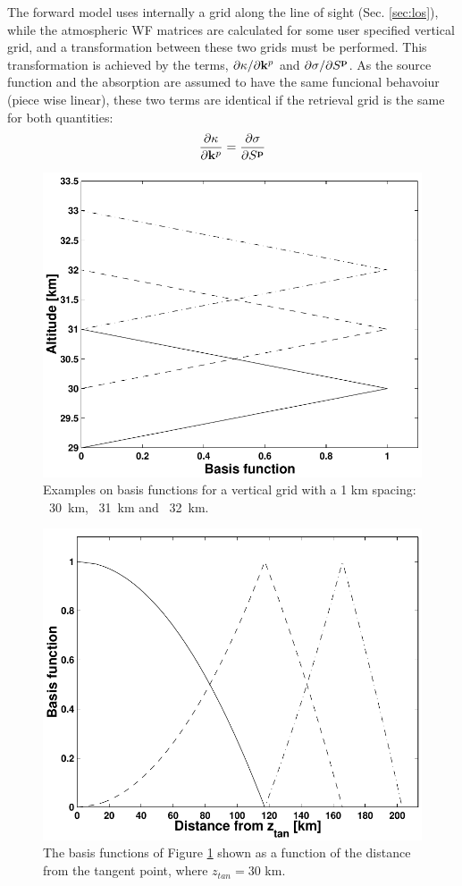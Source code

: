  
 The forward model uses
 internally a grid along the line of sight (Sec. \ref{sec:los}), while
 the atmospheric WF matrices are calculated for some user specified
 vertical grid, and a transformation between these two grids must be
 performed. This transformation is achieved by the terms,
 $\partial\kappa/ \partial \mathbf{k}^p$ and $\partial \sigma / \partial
 S^{\mathbf{p}}$. As the source function and the absorption are assumed to
 have the same funcional behavoiur (piece wise linear), these two
 terms are identical if the retrieval grid is the same for both quantities:
 \begin{equation}
   \frac{\partial \kappa}{\partial \mathbf{k}^p} =
   \frac{\partial \sigma}{\partial S^{\mathbf{p}}}
  \label{eq:wfuns:sandk}
 \end{equation}
 \begin{figure}[t]
  \begin{center}
   \includegraphics*[width=0.7\hsize]{Figs/fig_absbasis_z}
   \caption{Examples on basis functions for a vertical grid with a 1 km
            spacing: \lsolid~30~km, \ldashed~31~km and \ldashdot~32~km.}
   \label{fig:wfuns:zbasis}  
  \end{center}
 \end{figure}
 \begin{figure}[t]
  \begin{center}
   \includegraphics*[width=0.7\hsize]{Figs/fig_absbasis_l}
   \caption{The basis functions of Figure \ref{fig:wfuns:zbasis} shown
            as a function of the distance from the tangent point, where
            $z_{tan}=30$ km.}
   \label{fig:wfuns:lbasis}  
  \end{center}
 \end{figure}
